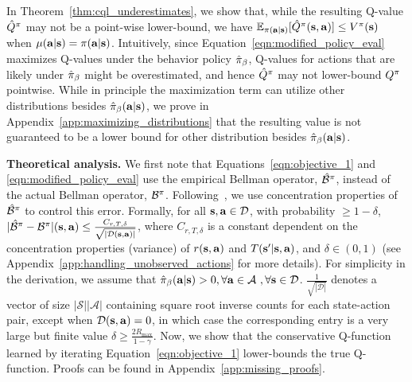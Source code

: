 In Theorem~\ref{thm:cql_underestimates}, we show that, while the resulting Q-value 
$\hat{Q}^{\pi}$ may not be a point-wise lower-bound, we have $\mathbb{E}_{\pi(\mathbf{a}|\mathbf{s})}[\hat{Q}^\pi(\mathbf{s}, \mathbf{a})] \leq V^\pi(\mathbf{s})$
 when $\mu(\mathbf{a}|\mathbf{s}) = \pi(\mathbf{a}|\mathbf{s})$. 
Intuitively, since Equation~\ref{eqn:modified_policy_eval} maximizes Q-values under the behavior policy $\hat{\pi}_\beta$, Q-values for actions that are likely under $\hat{\pi}_\beta$ might be overestimated, and hence $\hat{Q}^\pi$ may not lower-bound $Q^\pi$ pointwise. 
While in principle the maximization term can utilize other distributions besides $\hat{\pi}_\beta(\mathbf{a}|\mathbf{s})$, we prove in Appendix~\ref{app:maximizing_distributions} that the resulting value is not guaranteed to be a lower bound for other distribution besides $\hat{\pi}_\beta(\mathbf{a}|\mathbf{s})$.


\textbf{Theoretical analysis.}
We first note that Equations~\ref{eqn:objective_1} and \ref{eqn:modified_policy_eval} use the empirical Bellman operator, $\hat{\mathcal{B}}^\pi$, instead of the actual Bellman operator, $\mathcal{B}^\pi$.  Following~\citep{osband2016deep,jaksch2010near,o2018variational}, we use concentration properties of $\hat{\mathcal{B}}^\pi$ to control this error. Formally,
for all $\mathbf{s}, \mathbf{a} \in \mathcal{D}$, with  probability $\geq 1 - \delta$, $|\hat{\mathcal{B}}^\pi - \mathcal{B}^\pi|(\mathbf{s}, \mathbf{a}) \leq \frac{C_{r,T, \delta}}{\sqrt{|\mathcal{D}(\mathbf{s}, \mathbf{a})|}}$, where $C_{r, T, \delta}$ is a constant dependent on the concentration properties (variance) of $r(\mathbf{s}, \mathbf{a})$ and $T(\mathbf{s}'|\mathbf{s}, \mathbf{a})$, and $\delta\in (0, 1)$ (see Appendix~\ref{app:handling_unobserved_actions} for more details). 
{For simplicity in the derivation, we assume that $\hat{\pi}_\beta(\mathbf{a}|\mathbf{s}) > 0, \forall \mathbf{a} \in \mathcal{A}~, \forall \mathbf{s} \in \mathcal{D}$. $\frac{1}{\sqrt{|\mathcal{D}|}}$ denotes a vector of size $|\mathcal{S}| |\mathcal{A}|$ containing square root inverse counts for each state-action pair, except when $\mathcal{D}(\mathbf{s}, \mathbf{a}) = 0$, in which case the corresponding entry is a very large but finite value $\delta \geq \frac{2 R_{\max}}{1 - \gamma}$.}
Now, we show that the conservative Q-function learned by iterating Equation~\ref{eqn:objective_1} lower-bounds the true Q-function. Proofs can be found in Appendix~\ref{app:missing_proofs}.

